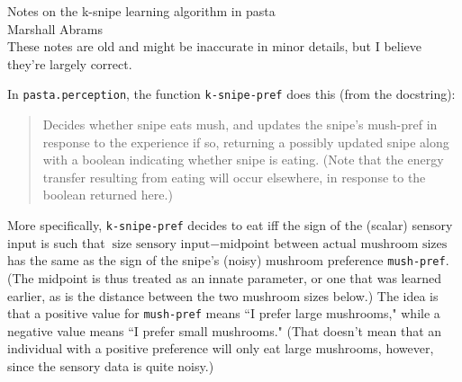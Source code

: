 \documentclass[12pt]{article}
\begin{document}
{\large Notes on the k-snipe learning algorithm in pasta}\\
Marshall Abrams\\

These notes are old and might be inaccurate in minor details, but
I believe they're largely correct.

In {\tt pasta.perception}, the function {\tt k-snipe-pref}
does this (from the docstring):
\begin{quote}\vspace{-2ex}
    Decides whether snipe eats mush, and updates the snipe's mush-pref
    in  response to the experience if so, returning a possibly updated
    snipe  along with a boolean indicating whether snipe is eating. 
    (Note that  the energy transfer resulting from eating will occur
    elsewhere, in  response to the boolean returned here.)
\end{quote}\vspace{-2ex}
More specifically, {\tt k-snipe-pref} decides to eat iff the sign of
the (scalar) sensory input is such that $\mbox{size sensory input} -
\mbox{midpoint between actual mushroom sizes}$ has the same as the
sign of the snipe's (noisy) mushroom preference {\tt mush-pref}.
(The midpoint is thus treated as an innate parameter, or one that was
learned  earlier, as is the distance between the two mushroom sizes
below.)  The idea is that a positive value for {\tt mush-pref} means
``I prefer large mushrooms," while a negative value means ``I prefer
small mushrooms." (That doesn't mean that an individual with a
positive preference will only eat large mushrooms, however, since the
sensory data is quite noisy.)
\end{document}
